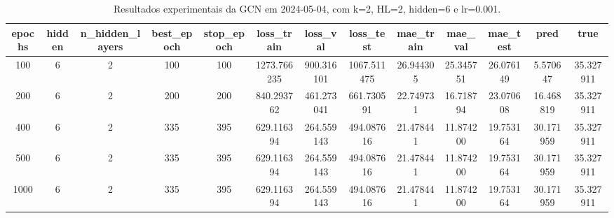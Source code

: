 \begin{table}[h]
\centering
\caption{Resultados experimentais da GCN em 2024-05-04, com k=2, HL=2, hidden=6 e lr=0.001.}
\label{tab:gcn_results_k2_hl2_h6_d20240504}
\begin{tabular}{ccccccccccccc}
\toprule
epochs & hidden & n\_hidden\_layers & best\_epoch & stop\_epoch & loss\_train & loss\_val & loss\_test & mae\_train & mae\_val & mae\_test & pred & true \\
\midrule
100 & 6 & 2 & 100 & 100 & 1273.766235 & 900.316101 & 1067.511475 & 26.944305 & 25.345751 & 26.076149 & 5.570647 & 35.327911 \\
200 & 6 & 2 & 200 & 200 & 840.293762 & 461.273041 & 661.730591 & 22.749731 & 16.718794 & 23.070608 & 16.468819 & 35.327911 \\
400 & 6 & 2 & 335 & 395 & 629.116394 & 264.559143 & 494.087616 & 21.478441 & 11.874200 & 19.753164 & 30.171959 & 35.327911 \\
500 & 6 & 2 & 335 & 395 & 629.116394 & 264.559143 & 494.087616 & 21.478441 & 11.874200 & 19.753164 & 30.171959 & 35.327911 \\
1000 & 6 & 2 & 335 & 395 & 629.116394 & 264.559143 & 494.087616 & 21.478441 & 11.874200 & 19.753164 & 30.171959 & 35.327911 \\
\bottomrule
\end{tabular}
\end{table}
